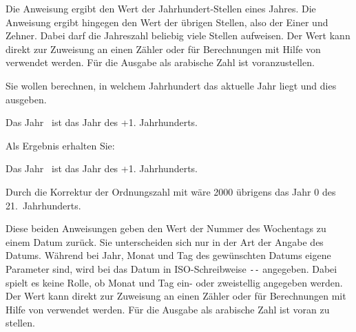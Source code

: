 \begin{Declaration}
\end{Declaration}%
Die Anweisung  ergibt
den Wert der Jahrhundert-Stellen eines Jahres. Die Anweisung
 ergibt hingegen den Wert der übrigen Stellen, also der
Einer und Zehner. Dabei darf die Jahreszahl beliebig viele Stellen aufweisen.
Der Wert kann direkt zur Zuweisung an einen Zähler oder für Berechnungen mit
Hilfe von  verwendet werden. Für die
Ausgabe  als arabische Zahl ist 
voranzustellen.
%
\begin{Example}
  Sie wollen berechnen, in welchem Jahrhundert das aktuelle Jahr liegt und
  dies ausgeben.
\begin{lstcode}
  Das Jahr \the\year\ ist das Jahr 
  \the\DecadePart{\year} des 
  \the\numexpr \CenturyPart{\year}+1\relax. 
  Jahrhunderts.
\end{lstcode}
  Als Ergebnis erhalten Sie:
  \begin{ShowOutput}
    Das Jahr \the\year\ ist das Jahr \the\DecadePart{\year} des \the\numexpr
    \CenturyPart{\year}+1\relax.  Jahrhunderts.
  \end{ShowOutput}
  Durch die Korrektur der Ordnungszahl mit  wäre 2000
  übrigens das Jahr 0 des 21.~Jahrhunderts.
\end{Example}%
\EndIndexGroup%
\ExampleEndFix


\begin{Declaration}
\end{Declaration}%
Diese beiden Anweisungen geben den Wert
der Nummer des Wochentags zu einem Datum zurück. Sie
unterscheiden sich nur in der Art der Angabe des Datums. Während bei
 Jahr, Monat und Tag des gewünschten Datums eigene Parameter
sind, wird bei  das Datum in ISO-Schreibweise
\texttt{-}\texttt{-} angegeben. Dabei
spielt es keine Rolle, ob Monat und Tag ein- oder zweistellig angegeben
werden. Der Wert kann direkt zur Zuweisung an einen Zähler oder für
Berechnungen mit Hilfe von  verwendet
werden. Für die Ausgabe als arabische Zahl ist
 voran zu stellen.

